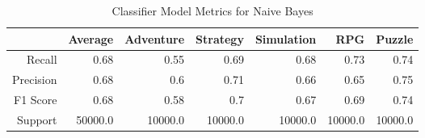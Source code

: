 \begin{table}[h]
    \centering
    \begin{tabular}{r|r|r|r|r|r|r}
        & Average & Adventure & Strategy & Simulation & RPG & Puzzle \\\hline
        Recall      & 0.68 & 0.55 & 0.69 & 0.68 & 0.73 & 0.74\\
        Precision   & 0.68 & 0.6 & 0.71 & 0.66 & 0.65 & 0.75\\
        F1 Score    & 0.68 & 0.58 & 0.7 & 0.67 & 0.69 & 0.74\\
        Support     & 50000.0 & 10000.0 & 10000.0 & 10000.0 & 10000.0 & 10000.0
\end{tabular}
    \caption{Classifier Model Metrics for Naive Bayes}
    \label{tab:model_metrics}
\end{table}